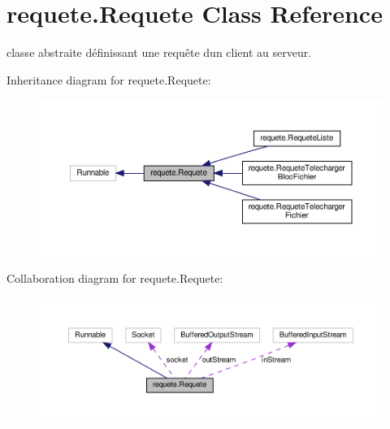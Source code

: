 \hypertarget{classrequete_1_1Requete}{}\section{requete.\+Requete Class Reference}
\label{classrequete_1_1Requete}


classe abstraite définissant une requête d\textquotesingle{}un client au serveur.  




Inheritance diagram for requete.\+Requete\+:\nopagebreak
\begin{figure}[H]
\begin{center}
\leavevmode
\includegraphics[width=350pt]{classrequete_1_1Requete__inherit__graph}
\end{center}
\end{figure}


Collaboration diagram for requete.\+Requete\+:\nopagebreak
\begin{figure}[H]
\begin{center}
\leavevmode
\includegraphics[width=350pt]{classrequete_1_1Requete__coll__graph}
\end{center}
\end{figure}
